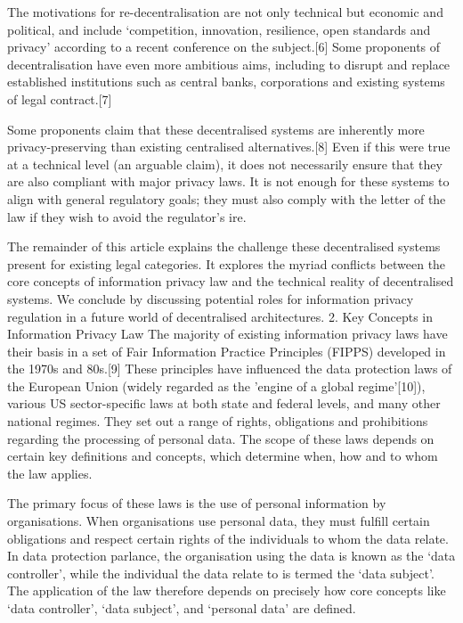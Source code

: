 \documentclass{acm_proc_article-sp}
\begin{document}
The motivations for re-decentralisation are not only technical but economic and political, and include ‘competition, innovation, resilience, open standards and privacy’ according to a recent conference on the subject.[6] Some proponents of decentralisation have even more ambitious aims, including to disrupt and replace established institutions such as central banks, corporations and existing systems of legal contract.[7]
 
Some proponents claim that these decentralised systems are inherently more privacy-preserving than existing centralised alternatives.[8] Even if this were true at a technical level (an arguable claim), it does not necessarily ensure that they are also compliant with major privacy laws. It is not enough for these systems to align with general regulatory goals; they must also comply with the letter of the law if they wish to avoid the regulator’s ire.
 
The remainder of this article explains the challenge these decentralised systems present for existing legal categories. It explores the myriad conflicts between the core concepts of information privacy law and the technical reality of decentralised systems. We conclude by discussing potential roles for information privacy regulation in a future world of decentralised architectures.
2. Key Concepts in Information Privacy Law
The majority of existing information privacy laws have their basis in a set of Fair Information Practice Principles (FIPPS) developed in the 1970s and 80s.[9] These principles have influenced the data protection laws of the European Union (widely regarded as the 'engine of a global regime'[10]), various US sector-specific laws at both state and federal levels, and many other national regimes. They set out a range of rights, obligations and prohibitions regarding the processing of personal data. The scope of these laws depends on certain key definitions and concepts, which determine when, how and to whom the law applies.
 
The primary focus of these laws is the use of personal information by organisations. When organisations use personal data, they must fulfill certain obligations and respect certain rights of the individuals to whom the data relate. In data protection parlance, the organisation using the data is known as the ‘data controller’, while the individual the data relate to is termed the ‘data subject'. The application of the law therefore depends on precisely how core concepts like ‘data controller’, ‘data subject’, and ‘personal data’ are defined.
 
\end{document}
